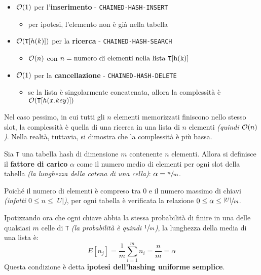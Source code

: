 \documentclass[italian, 10pt]{article}
\begin{document}
\begin{itemize}
  \item \(\mathcal{O}(1)\) per l'\textbf{inserimento} - \texttt{CHAINED-HASH-INSERT}
        \begin{itemize}
          \item per ipotesi, l'elemento non è già nella tabella
        \end{itemize}
  \item \(\mathcal{O}(\texttt{T}[h(k)])\) per la \textbf{ricerca} - \texttt{CHAINED-HASH-SEARCH}
        \begin{itemize}
          \item \(\mathcal{O}(n)\) con \(n = \text{numero di elementi nella lista \texttt{T}[h(k)]}\)
        \end{itemize}
  \item \(\mathcal{O}(1)\) per la \textbf{cancellazione} - \texttt{CHAINED-HASH-DELETE}
        \begin{itemize}
          \item se la lista è singolarmente concatenata, allora la complessità è \(\mathcal{O}(\texttt{T}[h(x.key)])\)
        \end{itemize}
\end{itemize}

\bigskip
Nel caso pessimo, in cui tutti gli \(n\) elementi memorizzati finiscono nello stesso slot, la complessità è quella di una ricerca in una lista di \(n\) elementi \textit{(quindi \(\mathcal{O}(n)\))}.
Nella realtà, tuttavia, si dimostra che la complessità è più bassa.

\bigskip
Sia \texttt{T} una tabella hash di dimensione \(m\) contenente \(n\) elementi.
Allora si definisce il \textbf{fattore di carico} \(\alpha\) come il numero medio di elementi per ogni slot della tabella \textit{(la lunghezza della catena di una cella)}: \(\alpha = \sfrac{n}{m}\).

Poiché il numero di elementi è compreso tra \(0\) e il numero massimo di chiavi \textit{(infatti \(0 \leq n \leq |U|\))}, per ogni tabella è verificata la relazione \( 0 \leq \alpha \leq \sfrac{|U|}{m} \).

\bigskip
Ipotizzando ora che ogni chiave abbia la stessa probabilità di finire in una delle qualsiasi \(m\) celle di \texttt{T} \textit{(la probabilità è quindi \(\sfrac{1}{m}\))}, la lunghezza della media di una lista è:
\[ E[n_j] = \displaystyle \dfrac{1}{m} \sum_{i=1}^{m} n_i = \dfrac{n}{m} = \alpha \]
Questa condizione è detta \textbf{ipotesi dell'hashing uniforme semplice}.
\end{document}
